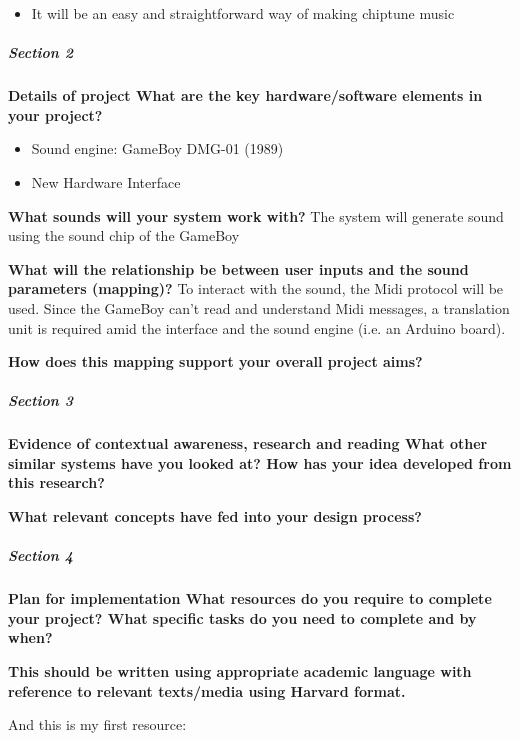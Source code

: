 \documentclass[]{article}
\begin{document}
        \begin{itemize}
        \item It will be an easy and straightforward way of making chiptune music
        \end{itemize}

\subparagraph[]{Section 2}

    \textbf{Details of project What are the key hardware/software elements in your
    project?}

        \begin{itemize}
            \item Sound engine: GameBoy DMG-01 (1989)
            \item New Hardware Interface
        \end{itemize}

    \textbf{What sounds will your system work with?}
    The system will generate sound using the sound chip of the GameBoy

    \textbf{What will the relationship be between user inputs and the sound 
    parameters (mapping)?} 
    To interact with the sound, the Midi protocol will be used.
    Since the GameBoy can't read and understand Midi messages,
    a translation unit is required amid the interface and the sound engine (i.e. an Arduino board).

    \textbf{How does this mapping support your overall project aims?}

\subparagraph[]{Section 3}

    \textbf{Evidence of contextual awareness, research and reading What other similar
    systems have you looked at? How has your idea developed from this research? }
    
    \textbf{What relevant concepts have fed into your design process?}

\subparagraph[]{Section 4}
    
    \textbf{Plan for implementation What resources do you require to complete your
    project? What specific tasks do you need to complete and by when?}

    \textbf{This should be written using appropriate academic language with reference
    to relevant texts/media using Harvard format.}

    And this is my first resource: \cite{kevin}


\printbibliography
\end{document}
